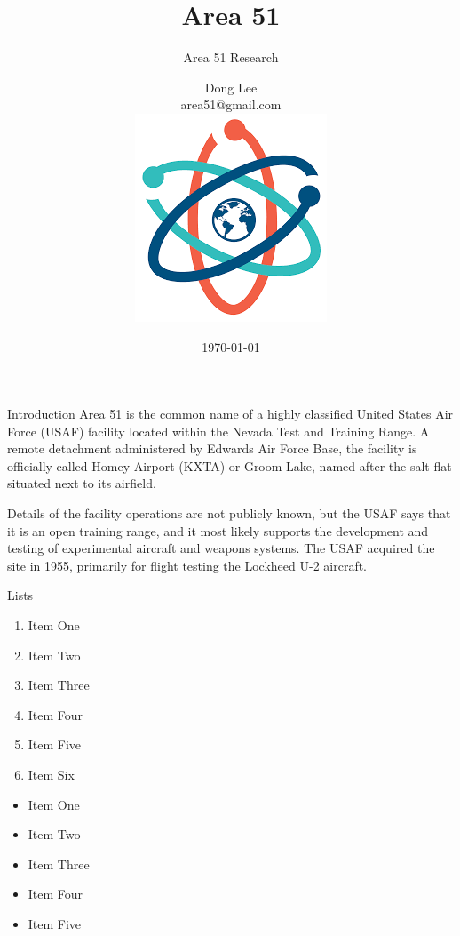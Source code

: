 \documentclass[12pt,aspect=169]{beamer}
\title[Area 51 Presentation 2020]{Area 51}
\subtitle{Area 51 Research}
\author[Dong Lee]{Dong Lee\\ \tiny area51@gmail.com\\[5mm]
\includegraphics[scale=0.08]{science}}
\institute[IITA]{Department of Astrophysics,\\ Indian Institute of Astrophysics,\\ Bengaluru-560068, India}
\date[\tiny \today]{\scriptsize \today}
\begin{document}
\begin{frame}
\maketitle
\end{frame}

\begin{frame}[t]{Introduction}
\scriptsize
Area 51 is the common name of a highly classified United States Air Force (USAF) facility located within the Nevada Test and Training Range. A remote detachment administered by Edwards Air Force Base, the facility is officially called Homey Airport (KXTA) or Groom Lake, named after the salt flat situated next to its airfield.

Details of the facility operations are not publicly known, but the USAF says that it is an open training range, and it most likely supports the development and testing of experimental aircraft and weapons systems. The USAF acquired the site in 1955, primarily for flight testing the Lockheed U-2 aircraft.

\end{frame}

 \begin{frame}[t]{Lists}
\scriptsize
\begin{enumerate}
	\item Item One
	\item Item Two
	\item Item Three
	\item Item Four
	\item Item Five	
	\item Item Six
	
\end{enumerate}

\begin{itemize}
	\item Item One
	\item Item Two
	\item Item Three
	\item Item Four
	\item Item Five	
\end{itemize}

\end{frame}
\end{document}
